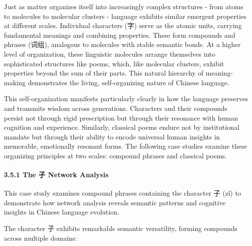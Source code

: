 \documentclass[
  11pt,
  letterpaper,
]{article}
\begin{document}
Just as matter organizes itself into increasingly complex structures -
from atoms to molecules to molecular clusters - language exhibits
similar emergent properties at different scales. Individual characters
(字) serve as the atomic units, carrying fundamental meanings and
combining properties. These form compounds and phrases (词组), analogous
to molecules with stable semantic bonds. At a higher level of
organization, these linguistic molecules arrange themselves into
sophisticated structures like poems, which, like molecular clusters,
exhibit properties beyond the sum of their parts. This natural hierarchy
of meaning-making demonstrates the living, self-organizing nature of
Chinese language.

This self-organization manifests particularly clearly in how the
language preserves and transmits wisdom across generations. Characters
and their compounds persist not through rigid prescription but through
their resonance with human cognition and experience. Similarly,
classical poems endure not by institutional mandate but through their
ability to encode universal human insights in memorable, emotionally
resonant forms. The following case studies examine these organizing
principles at two scales: compound phrases and classical poems.

\paragraph{3.5.1 The 子 Network
Analysis}\label{the-ux5b50-network-analysis}

This case study examines compound phrases containing the character 子
(zǐ) to demonstrate how network analysis reveals semantic patterns and
cognitive insights in Chinese language evolution.

The character 子 exhibits remarkable semantic versatility, forming
compounds across multiple domains:
\end{document}
